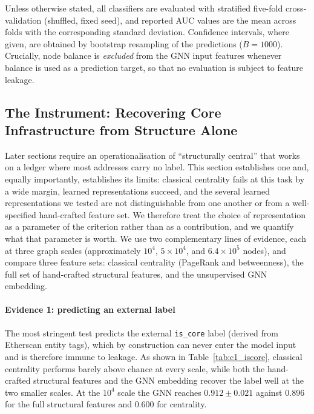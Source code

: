 \documentclass[final,5p,times]{elsarticle}
\begin{document}
Unless otherwise stated, all classifiers are evaluated with stratified
five-fold cross-validation (shuffled, fixed seed), and reported AUC values
are the mean across folds with the corresponding standard deviation.
Confidence intervals, where given, are obtained by bootstrap resampling
of the predictions ($B=1000$). Crucially, node balance is \emph{excluded}
from the GNN input features whenever balance is used as a prediction target,
so that no evaluation is subject to feature leakage.

\subsection{The Instrument: Recovering Core Infrastructure from Structure
Alone}
\label{sec:c1}

Later sections require an operationalisation of ``structurally central''
that works on a ledger where most addresses carry no label. This section
establishes one and, equally importantly, establishes its limits: classical
centrality fails at this task by a wide margin, learned representations
succeed, and the several learned representations we tested are not
distinguishable from one another or from a well-specified hand-crafted
feature set. We therefore treat the choice of representation as a parameter
of the criterion rather than as a contribution, and we quantify what that
parameter is worth. We use two complementary lines of evidence, each at
three graph scales (approximately $10^4$, $5\times10^4$, and $6.4\times10^5$
nodes), and compare three feature sets: classical centrality (PageRank and
betweenness), the full set of hand-crafted structural features, and the
unsupervised GNN embedding.

\paragraph{Evidence 1: predicting an external label}
The most stringent test predicts the external \texttt{is\_core} label
(derived from Etherscan entity tags), which by construction can never enter
the model input and is therefore immune to leakage. As shown in
Table~\ref{tab:c1_iscore}, classical centrality performs barely above
chance at every scale, while both the hand-crafted structural features and
the GNN embedding recover the label well at the two smaller scales. At the
$10^4$ scale the GNN reaches $0.912 \pm 0.021$ against $0.896$ for the full
structural features and $0.600$ for centrality.
\end{document}
